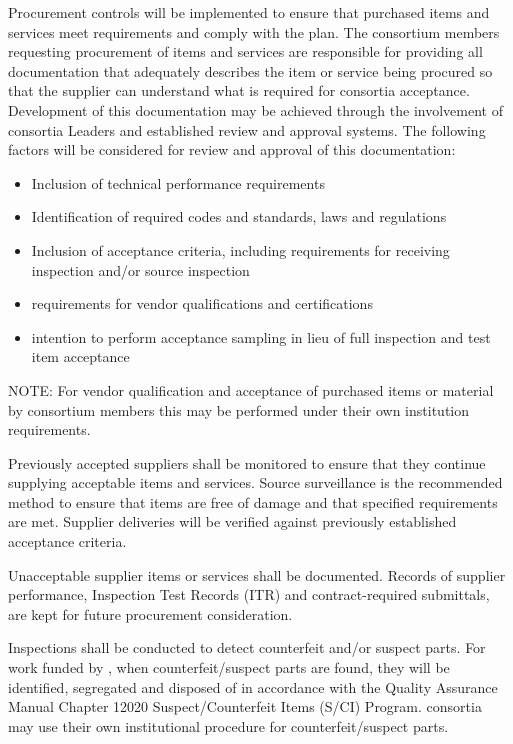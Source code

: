Procurement controls will be implemented to ensure that
purchased items and services meet  requirements and comply
with the   plan.  The consortium members
requesting procurement of items and services are responsible for
providing all documentation that adequately describes the item or
service being procured so that the supplier can understand what is
required for consortia acceptance. Development of this documentation
may be achieved through the involvement of consortia Leaders and
established review and approval systems. The following factors will be
considered for review and approval of this documentation:
\begin{itemize}
 \item Inclusion of technical performance requirements
 \item Identification of required codes and standards, laws and
   regulations
 \item Inclusion of acceptance criteria, including requirements for
   receiving inspection and/or source inspection
 \item {} requirements for vendor qualifications and
   certifications
 \item {} intention to perform acceptance sampling in lieu
   of full inspection and test item acceptance
\end{itemize}
NOTE: For vendor qualification and acceptance of purchased items or
material by consortium members this may be performed under their own
institution requirements.

Previously accepted suppliers shall be monitored to ensure that they
continue supplying acceptable items and services. Source surveillance
is the recommended method to ensure that items are free of damage and
that specified requirements are met. Supplier deliveries will be
verified against previously established acceptance criteria.

Unacceptable supplier items or services shall be documented. Records
of supplier performance, Inspection Test Records (ITR) and
contract-required submittals, are kept for future procurement
consideration.

Inspections shall be conducted to detect counterfeit and/or suspect
parts. For work funded by , when counterfeit/suspect parts
are found, they will be identified, segregated and disposed of in
accordance with the \fnal Quality Assurance Manual Chapter 12020
Suspect/Counterfeit Items (S/CI) Program.  consortia may
use their own institutional procedure for counterfeit/suspect parts.

